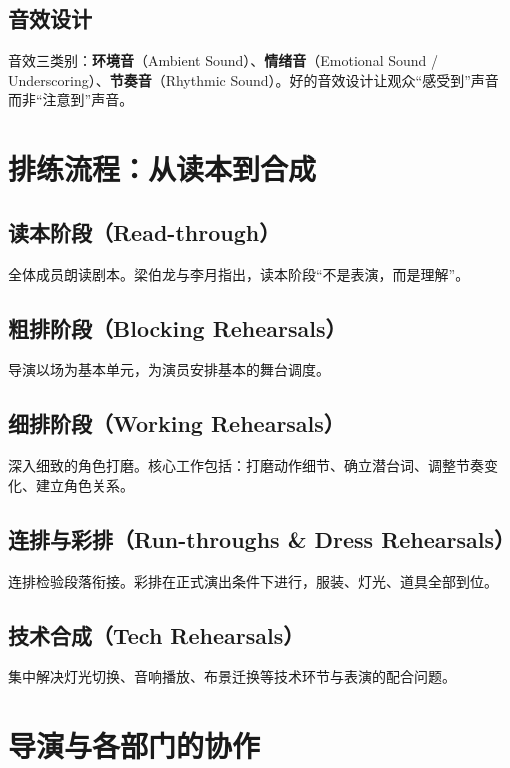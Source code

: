 \subsection{音效设计}

音效三类别：\textbf{环境音}（Ambient Sound）、\textbf{情绪音}（Emotional Sound / Underscoring）、\textbf{节奏音}（Rhythmic Sound）。好的音效设计让观众\enquote{感受到}声音而非\enquote{注意到}声音。

\section{排练流程：从读本到合成}

\subsection{读本阶段（Read-through）}

全体成员朗读剧本。梁伯龙与李月指出，读本阶段\enquote{不是表演，而是理解}\cite{liang:acting}。

\subsection{粗排阶段（Blocking Rehearsals）}

导演以场为基本单元，为演员安排基本的舞台调度。

\subsection{细排阶段（Working Rehearsals）}

深入细致的角色打磨。核心工作包括：打磨动作细节、确立潜台词、调整节奏变化、建立角色关系。

\subsection{连排与彩排（Run-throughs \& Dress Rehearsals）}

连排检验段落衔接。彩排在正式演出条件下进行，服装、灯光、道具全部到位。

\subsection{技术合成（Tech Rehearsals）}

集中解决灯光切换、音响播放、布景迁换等技术环节与表演的配合问题。

\section{导演与各部门的协作}

